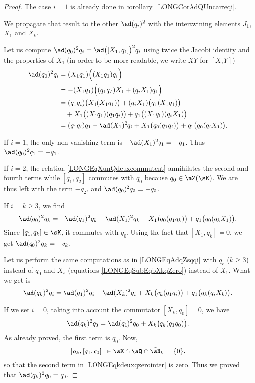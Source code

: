 \begin{proof}
	The case $i=1$ is already done in corollary~\ref{LONGCorAdQUncarreqi}.

	We propagate that result to the other $\ad(q_i)^2$ with the intertwining elements $J_1$, $X_1$ and $X_k$.

	Let us compute $\ad(q_0)^2q_i=\ad\big([X_1,q_1]\big)^2q_i$ using twice the Jacobi identity and the properties of $X_1$ (in order to be more readable, we write $XY$ for $[X,Y]$)
	\begin{equation}		\label{LONGEqAdqZsqqi}
		\begin{aligned}[]
			\ad(q_0)^2q_i	&=	(X_1q_1)\Big( (X_1q_1)q_i \Big)\\
					&=	-(X_1q_1)\Big( (q_1q_I)X_1+(q_iX_1)q_1 \Big)\\
					&=(q_1q_i)\big( X_1(X_1q_1) \big)+(q_iX_1)\big( q_1(X_1q_1) \big)\\
					&\quad + X_1\big( (X_1q_1)(q_1q_i) \big)+q_1\big( (X_1q_1)(q_iX_1) \big)\\
					&=(q_1q_i)q_1-\ad(X_1)^2q_i+X_1\big( q_0(q_1q_i) \big)+q_1\big( q_0(q_iX_1) \big).
		\end{aligned}
	\end{equation}

	If $i=1$, the only non vanishing term is $-\ad(X_1)^2q_1=-q_1$.  Thus $\ad(q_0)^2q_1=-q_1$.

	If $i=2$, the relation \eqref{LONGEqXunQdeuxcommutent} annihilates the second and fourth terms while $[q_1,q_2]$ commutes with $q_0$ because $q_0\in\mZ(\sK)$. We are thus left with the term $-q_2$, and $\ad(q_0)^2q_2=-q_2$.

	If $i=k\geq 3$, we find
	\begin{equation}
		\ad(q_0)^2q_k=-\ad(q_1)^2q_k-\ad(X_1)^2q_k+X_1\big( q_0(q_1q_k) \big)+q_1\big( q_0(q_kX_1) \big).
	\end{equation}
	Since $[q_1,q_k]\in\sK$, it commutes with $q_0$. Using the fact that $[X_1,q_k]=0$, we get $\ad(q_0)^2q_k=-q_k$.

	Let us perform the same computations  as in \eqref{LONGEqAdqZsqqi} with $q_k$ ($k\geq 3$) instead of $q_0$ and $X_k$ (equations \eqref{LONGEqSubEqbXkqZero}) instead of $X_1$. What we get is
	\begin{equation}
		\ad(q_k)^2q_i=\ad(q_1)^2q_i-\ad(X_k)^2q_i+X_k\big( q_k(q_1q_i) \big)+q_1\big( q_k(q_iX_k) \big).
	\end{equation}

	If we set $i=0$, taking into account the commutator $[X_k,q_0]=0$, we have
	\begin{equation}		\label{LONGEqkdeuxqzerointer}
		\ad(q_k)^2q_0=\ad(q_1)^2q_0+X_k\big( q_k(q_1q_0) \big).
	\end{equation}
	As already proved, the first term is $q_0$. Now,
	\begin{equation}
		\big[ q_k,[q_1,q_0] \big]\in\sK\cap\sQ\cap\tilde\sN_k=\{ 0 \},
	\end{equation}
	so that the second term in \eqref{LONGEqkdeuxqzerointer} is zero. Thus we proved that $\ad(q_k)^2q_0=q_0$.


\end{proof}
